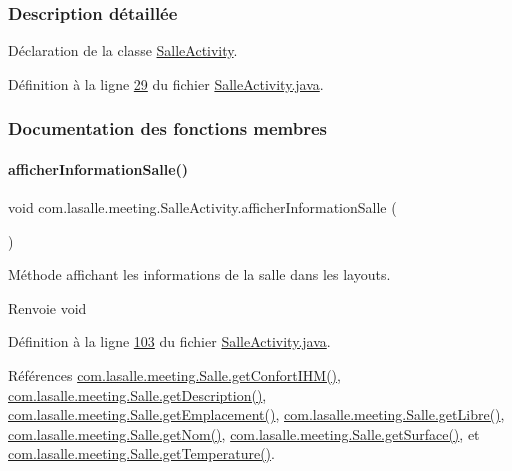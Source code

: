 \subsubsection{Description détaillée}
Déclaration de la classe \hyperlink{classcom_1_1lasalle_1_1meeting_1_1_salle_activity}{Salle\+Activity}. 

Définition à la ligne \hyperlink{_salle_activity_8java_source_l00029}{29} du fichier \hyperlink{_salle_activity_8java_source}{Salle\+Activity.\+java}.



\subsubsection{Documentation des fonctions membres}
\mbox{\label{classcom_1_1lasalle_1_1meeting_1_1_salle_activity_aee6f0cd7a9029d5fbe12bf85c2316f82}} 
\paragraph{\texorpdfstring{afficher\+Information\+Salle()}{afficherInformationSalle()}}
{\footnotesize\ttfamily void com.\+lasalle.\+meeting.\+Salle\+Activity.\+afficher\+Information\+Salle (\begin{DoxyParamCaption}{ }\end{DoxyParamCaption})}



Méthode affichant les informations de la salle dans les layouts. 

\begin{DoxyReturn}{Renvoie}
void 
\end{DoxyReturn}


Définition à la ligne \hyperlink{_salle_activity_8java_source_l00103}{103} du fichier \hyperlink{_salle_activity_8java_source}{Salle\+Activity.\+java}.



Références \hyperlink{_salle_8java_source_l00233}{com.\+lasalle.\+meeting.\+Salle.\+get\+Confort\+I\+H\+M()}, \hyperlink{_salle_8java_source_l00276}{com.\+lasalle.\+meeting.\+Salle.\+get\+Description()}, \hyperlink{_salle_8java_source_l00156}{com.\+lasalle.\+meeting.\+Salle.\+get\+Emplacement()}, \hyperlink{_salle_8java_source_l00174}{com.\+lasalle.\+meeting.\+Salle.\+get\+Libre()}, \hyperlink{_salle_8java_source_l00165}{com.\+lasalle.\+meeting.\+Salle.\+get\+Nom()}, \hyperlink{_salle_8java_source_l00215}{com.\+lasalle.\+meeting.\+Salle.\+get\+Surface()}, et \hyperlink{_salle_8java_source_l00267}{com.\+lasalle.\+meeting.\+Salle.\+get\+Temperature()}.



